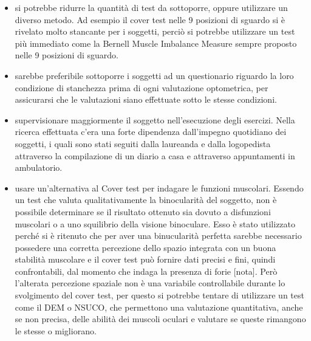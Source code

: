 \begin{itemize}
\item si potrebbe ridurre la quantità di test da sottoporre, oppure utilizzare un diverso metodo. Ad esempio il cover test nelle 9 posizioni di sguardo si è rivelato molto stancante per i soggetti, perciò si potrebbe utilizzare un test più immediato come la Bernell Muscle Imbalance Measure sempre proposto nelle 9 posizioni di sguardo.
\item sarebbe preferibile sottoporre i soggetti ad un questionario riguardo la loro condizione di stanchezza prima di ogni valutazione optometrica, per assicurarsi che le valutazioni siano effettuate sotto le stesse condizioni.
\item supervisionare maggiormente il soggetto nell’esecuzione degli esercizi. Nella ricerca effettuata c’era una forte dipendenza dall’impegno quotidiano dei soggetti, i quali sono stati seguiti dalla laureanda e dalla logopedista attraverso la compilazione di un diario a casa e attraverso appuntamenti in ambulatorio.
\item usare un’alternativa al Cover test per indagare le funzioni muscolari. Essendo un test che valuta qualitativamente la binocularità del soggetto, non è possibile determinare se il risultato ottenuto sia dovuto a disfunzioni muscolari o a uno squilibrio della visione binoculare. Esso è stato utilizzato perché si è ritenuto che per aver una binucularità perfetta sarebbe necessario possedere una corretta percezione dello spazio integrata con un buona stabilità muscolare e il cover test può fornire dati precisi e fini, quindi confrontabili, dal momento che indaga la presenza di forie [nota]. Però l’alterata percezione spaziale non è una variabile controllabile durante lo svolgimento del cover test, per questo si potrebbe tentare di utilizzare un test come il DEM o NSUCO, che permettono una valutazione quantitativa, anche se non precisa, delle abilità dei muscoli oculari e valutare se queste rimangono le stesse o migliorano.
\end{itemize}
